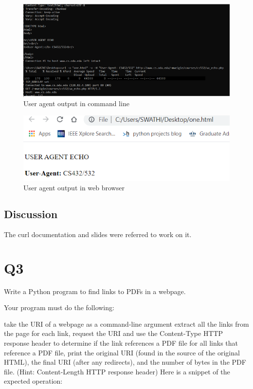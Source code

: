 \documentclass[12pt]{article}
\begin{document}
\begin{figure}[h]
    \centering
    \includegraphics[trim=0 0 10 8, clip, width=\textwidth] {jj.PNG}
    \caption{User agent output in command line}
    \label{fig:web-growth}
\end{figure}
\newline
\begin{figure}[h]
    \centering
    \includegraphics[trim=0 0 10 8, clip, width=\textwidth] {jj2.PNG}
    \caption{User agent output in web browser}
    \label{fig:web-growth}
\end{figure}
\subsection*{Discussion}
The curl documentation and slides were referred to work on it.
\section*{Q3}
Write a Python program to find links to PDFs in a webpage.

Your program must do the following:

take the URI of a webpage as a command-line argument
extract all the links from the page
for each link, request the URI and use the Content-Type HTTP response header to determine if the link references a PDF file
for all links that reference a PDF file, print the original URI (found in the source of the original HTML), the final URI (after any redirects), and the number of bytes in the PDF file. (Hint: Content-Length HTTP response header)
Here is a snippet of the expected operation:
\end{document}
